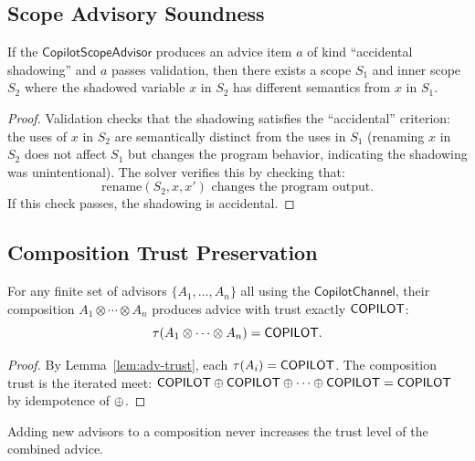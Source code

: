\documentclass[11pt]{article}
\newcommand{\ScopeAdv}{\mathsf{CopilotScopeAdvisor}}
\newcommand{\CopChan}{\mathsf{CopilotChannel}}
\begin{document}
\subsection{Scope Advisory Soundness}
\label{sec:formal:scope}

\begin{theorem}
\label{thm:scope-sound}
If the $\ScopeAdv$ produces an advice item $a$ of kind
``accidental shadowing'' and $a$ passes validation, then there
exists a scope $S_1$ and inner scope $S_2$ where the shadowed
variable $x$ in $S_2$ has different semantics from $x$ in $S_1$.
\end{theorem}

\begin{proof}
Validation checks that the shadowing satisfies the ``accidental''
criterion: the uses of $x$ in $S_2$ are semantically distinct from
the uses in $S_1$ (\ie renaming $x$ in $S_2$ does not affect $S_1$
but changes the program behavior, indicating the shadowing was
unintentional).  The solver verifies this by checking that:
\[
  \mathrm{rename}(S_2, x, x') \text{ changes the program output.}
\]
If this check passes, the shadowing is accidental.
\end{proof}

\subsection{Composition Trust Preservation}
\label{sec:formal:composition}

\begin{theorem}
\label{thm:comp-trust}
For any finite set of advisors $\{A_1, \ldots, A_n\}$ all using
the $\CopChan$, their composition $A_1 \otimes \cdots \otimes A_n$
produces advice with trust exactly $\mathsf{COPILOT}$:
\[
  \tau(A_1 \otimes \cdots \otimes A_n) = \mathsf{COPILOT}.
\]
\end{theorem}

\begin{proof}
By Lemma~\ref{lem:adv-trust}, each $\tau(A_i) = \mathsf{COPILOT}$.
The composition trust is the iterated meet:
$\mathsf{COPILOT} \oplus \mathsf{COPILOT} \oplus \cdots \oplus \mathsf{COPILOT} = \mathsf{COPILOT}$
by idempotence of $\oplus$.
\end{proof}

\begin{corollary}
\label{cor:no-escalation}
Adding new advisors to a composition never increases the trust
level of the combined advice.
\end{corollary}
\end{document}
